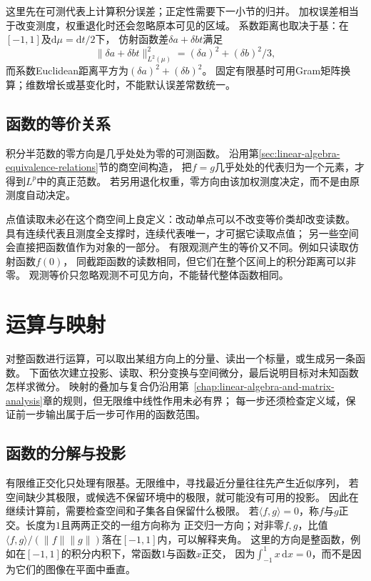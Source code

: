 这里先在可测代表上计算积分误差；正定性需要下一小节的归并。
加权误差相当于改变测度，权重退化时还会忽略原本可见的区域。
系数距离也取决于基：在$[-1,1]$及$\mathrm d\mu=\mathrm dt/2$下，
仿射函数差$\delta a+\delta bt$满足
\[
 \lVert\delta a+\delta bt\rVert_{L^2(\mu)}^2
 =(\delta a)^2+(\delta b)^2/3,
\]
而系数Euclidean距离平方为$(\delta a)^2+(\delta b)^2$。
固定有限基时可用Gram矩阵换算；维数增长或基变化时，不能默认误差常数统一。

\subsection{函数的等价关系}
\label{sec:functional-equivalence-relations}

积分半范数的零方向是几乎处处为零的可测函数。
沿用第\ref{sec:linear-algebra-equivalence-relations}节的商空间构造，
把$f=g$几乎处处的代表归为一个元素，才得到$L^p$中的真正范数。
若另用退化权重，零方向由该加权测度决定，而不是由原测度自动决定。

点值读取未必在这个商空间上良定义：改动单点可以不改变等价类却改变读数。
具有连续代表且测度全支撑时，连续代表唯一，才可据它读取点值；
另一些空间会直接把函数值作为对象的一部分。
有限观测产生的等价又不同。例如只读取仿射函数$f(0)$，
同截距函数的读数相同，但它们在整个区间上的积分距离可以非零。
观测等价只忽略观测不可见方向，不能替代整体函数相同。

\section{运算与映射}
\label{sec:functional-operators}

对整函数进行运算，可以取出某组方向上的分量、读出一个标量，或生成另一条函数。
下面依次建立投影、读取、积分变换与空间微分，最后说明目标对未知函数怎样求微分。
映射的叠加与复合仍沿用第~\ref{chap:linear-algebra-and-matrix-analysis}章的规则，但无限维中线性作用未必有界；
每一步还须检查定义域，保证前一步输出属于后一步可作用的函数范围。

\subsection{函数的分解与投影}
\label{sec:functional-decomposition-projection}
\label{sec:functional-orthogonal-expansions-projections}

\label{sec:functional-projection-approximation}

有限维正交化只处理有限基。无限维中，寻找最近分量往往先产生近似序列，
若空间缺少其极限，或候选不保留环境中的极限，就可能没有可用的投影。
因此在继续计算前，需要检查空间和子集各自保留什么极限。
若$\langle f,g\rangle=0$，称$f$与$g$正交。长度为$1$且两两正交的一组方向称为
正交归一方向；对非零$f,g$，比值
$\langle f,g\rangle/(\lVert f\rVert\lVert g\rVert)$落在$[-1,1]$内，可以解释夹角。
这里的方向是整函数，例如在$[-1,1]$的积分内积下，常函数$1$与函数$x$正交，
因为$\int_{-1}^1x\,\mathrm dx=0$，而不是因为它们的图像在平面中垂直。

